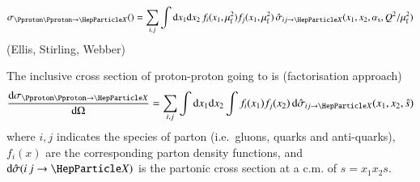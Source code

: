 \begin{align*}
  \sigma_{\Pproton\Pproton \ra \PX}() = \sum_{i,j} \int \mathrm{d}x_1 \mathrm{d}x_2 \, f_i(x_1, \muF^2) f_j(x_1, \muF^2) \, \hat{\sigma}_{i j \ra \PX}(x_1, x_2, \alphas, Q^2 / \muF^2)
\end{align*}
(Ellis, Stirling, Webber)



The inclusive cross section of proton-proton going to \PX is (factorisation approach)
\begin{align*}
  \frac{\mathrm{d}\sigma_{\Pproton\Pproton \ra \PX}}{\mathrm{d}\Omega} = \sum_{i,j} \int \mathrm{d}x_1 \mathrm{d}x_2 \int f_i(x_1) f_j(x_2) \, \mathrm{d}\hat{\sigma}_{i j \ra \PX}(x_1, x_2, \hat{s})
\end{align*}
where $i, j$ indicates the species of parton (i.e.\ gluons, quarks and
anti-quarks), $f_i(x)$ are the corresponding parton density functions,
and $\mathrm{d}\hat{\sigma}(i\,j \ra \PX)$ is the partonic cross
section at a c.m. of $\hat{s} = x_1 x_2 s$.


